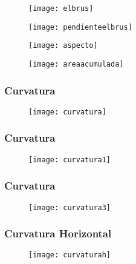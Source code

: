 \documentclass{beamer}
\begin{document}
\begin{frame}
 \begin{figure}
    \centering
    \texttt{[image: elbrus]}
  \end{figure}
\end{frame}
\begin{frame}
 \begin{figure}
    \centering
    \texttt{[image: pendienteelbrus]}
  \end{figure}
\end{frame}
\begin{frame}
 \begin{figure}
    \centering
    \texttt{[image: aspecto]}
  \end{figure}
\end{frame}
\begin{frame}
 \begin{figure}
    \centering
    \texttt{[image: areaacumulada]}
  \end{figure}
\end{frame}
\begin{frame}
\frametitle{Curvatura}
 \begin{figure}
    \centering
    \texttt{[image: curvatura]}
  \end{figure}
\end{frame}
\begin{frame}
\frametitle{Curvatura}
 \begin{figure}
    \centering
    \texttt{[image: curvatura1]}
  \end{figure}
\end{frame}
\begin{frame}
\frametitle{Curvatura}
 \begin{figure}
    \centering
    \texttt{[image: curvatura3]}
  \end{figure}
\end{frame}
\begin{frame}
\frametitle{Curvatura Horizontal}
 \begin{figure}
    \centering
    \texttt{[image: curvaturah]}
  \end{figure}
\end{frame}
\end{document}
